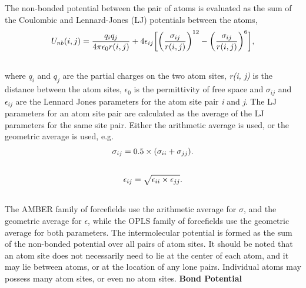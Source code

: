 \documentclass[letterpaper,10pt,english]{manual}
\begin{document}
The non-bonded potential between the pair of atoms is evaluated as the sum of the Coulombic and Lennard-Jones (LJ) potentials between the atoms,
\hypertarget{equation-intermol2}{}\begin{gather}
\begin{split}U_{nb}(i,j) = \frac{q_i q_j}{4\pi\epsilon_{0} r(i,j)} + 4\epsilon_{ij}\biggl[ \biggl(\frac{\sigma_{ij}}{r(i,j)}\biggr)^{12} - \biggl(\frac{\sigma_{ij}}{r(i,j)}\biggr)^6 \biggr],\end{split}\label{protoms-intermol2}\\\begin{split}\end{split}\notag
\end{gather}
where $q_i$ and $q_j$ are the partial charges on the two atom sites, \emph{r(i, j)} is the distance between the atom sites, $\epsilon_0$ is the permittivity of free space and $\sigma_{ij}$ and $\epsilon_{ij}$ are the Lennard Jones parameters for the atom site pair \emph{i} and \emph{j}. The LJ parameters for an atom site pair are calculated as the average of the LJ parameters for the same site pair.
Either the arithmetic average is used, or the geometric average is used, e.g.
\hypertarget{equation-arithmetriccomb}{}\begin{gather}
\begin{split}\sigma_{ij} = 0.5\times(\sigma_{ii} + \sigma_{jj}).\end{split}\label{protoms-arithmetriccomb}\\\begin{split}\end{split}\notag
\end{gather}\hypertarget{equation-geometriccomb}{}\begin{gather}
\begin{split}\epsilon_{ij} = \sqrt{\epsilon_{ii}\times\epsilon_{jj}}.\end{split}\label{protoms-geometriccomb}\\\begin{split}\end{split}\notag
\end{gather}
The AMBER family of forcefields use the arithmetic average for $\sigma$, and the geometric average for $\epsilon$, while the OPLS family of forcefields use the geometric average for both parameters. The intermolecular potential is formed as the sum of the non-bonded potential over all pairs of atom sites. It should be noted that an atom site does not necessarily need to lie at the center of each atom, and it may lie between atoms, or at the location of any lone pairs. Individual atoms may possess many atom sites, or even no atom sites.
\textbf{Bond Potential}
\end{document}
